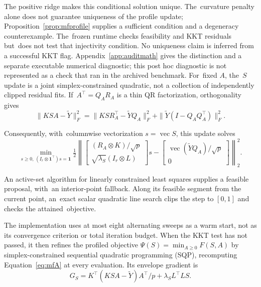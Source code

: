 \documentclass[mathematics,article,accept,moreauthors]{Definitions/mdpi}
\newcommand{\one}{\mathbf{1}}
\begin{document}
The positive ridge makes this conditional solution unique. The~curvature penalty alone does not guarantee uniqueness of the profile update; Proposition~\ref{prop:mfprofile} supplies a sufficient condition and a degeneracy counterexample. The~frozen runtime checks feasibility and KKT residuals but~does not test that injectivity condition. No uniqueness claim is inferred from a successful KKT flag. Appendix~\ref{app:auditmath} gives the distinction and a separate executable numerical diagnostic; this post hoc diagnostic is not represented as a check that ran in the archived benchmark. For~fixed $A$, the~$S$ update is a joint simplex-constrained quadratic, not a collection of independently clipped residual fits. If~$A^\top=Q_AR_A$ is a thin QR factorization, orthogonality gives
\begin{equation}\label{eq:mfqr}
 \|KSA-\widetilde Y\|_F^2
 =\|KS R_A^\top-\widetilde YQ_A\|_F^2+
   \|\widetilde Y(I-Q_AQ_A^\top)\|_F^2.
\end{equation}

Consequently, with~columnwise vectorization $s=\operatorname{vec}S$, this update solves
\begin{equation}\label{eq:mfS}
 \min_{s\geq0,\,(I_r\otimes\one^\top)s=\one}
 \tfrac12\left\|
 \begin{bmatrix}(R_A\otimes K)/\sqrt p\\\sqrt{\lambda_S}(I_r\otimes L)\end{bmatrix}s
 -\begin{bmatrix}\operatorname{vec}(\widetilde YQ_A)/\sqrt p\\0\end{bmatrix}
 \right\|_2^2.
\end{equation}

An active-set algorithm for linearly constrained least squares supplies a feasible proposal, with~an interior-point fallback. Along its feasible segment from the current point, an~exact scalar quadratic line search clips the step to $[0,1]$ and checks the attained~objective.

The implementation uses at most eight alternating sweeps as a warm start, not as its convergence criterion or total iteration budget. When the KKT test has not passed, it then refines the profiled objective $\Psi(S)=\min_{A\geq0}F(S,A)$ by simplex-constrained sequential quadratic programming (SQP), recomputing Equation~\eqref{eq:mfA} at every evaluation. Its envelope gradient is
\begin{equation}\label{eq:mfgrad}
 G_S=K^\top(KSA-\widetilde Y)A^\top/p+\lambda_SL^\top LS.
\end{equation}
\end{document}
